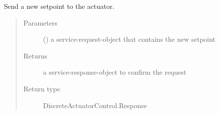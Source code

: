 \documentclass[a4paper,12pt,twoside]{article}
\begin{document}
\begin{fulllineitems}
\begin{fulllineitems}
\begin{quote}
\begin{description}
\end{description}\end{quote}

\end{fulllineitems}


\begin{fulllineitems}
\label{\detokenize{meso_control_pkg:meso_control_pkg.sps_binary_actuator_node.SpsBinaryActuator.set_actuator}}
Send a new setpoint to the actuator.
\begin{quote}\begin{description}
\item[{Parameters}] \leavevmode
{} () \textendash{} a service-request-object that contains the new setpoint

\item[{Returns}] \leavevmode
a service-response-object to confirm the request

\item[{Return type}] \leavevmode
DiscreteActuatorControl.Response

\end{description}\end{quote}

\end{fulllineitems}


\end{fulllineitems}

\label{\detokenize{meso_control_pkg:module-meso_control_pkg.sps_discrete_actuator_node}}
\end{document}
